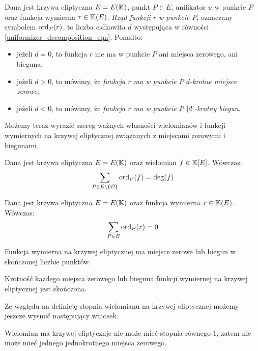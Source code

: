 \begin{definition}
Dana jest krzywa eliptyczna $E = E(\mathbb{K})$,
punkt $P \in E$,
unifikator $u$ w punkcie $P$
oraz funkcja wymierna $r \in \mathbb{K}(E)$.
\emph{Rząd funkcji $r$ w punkcie $P$},
oznaczany symbolem $\operatorname{ord}_P(r)$,
to liczba całkowita $d$
występująca w równości \ref{uniformizer_decomposition_eqn}.
Ponadto:
\begin{itemize}
\item jeżeli $d = 0$,
to funkcja $r$ nie ma w punkcie $P$ ani miejsca zerowego, ani bieguna;
\item jeżeli $d > 0$, to mówimy,
że \emph{funkcja $r$ ma w punkcie $P$ $d$-krotne miejsce zerowe};
\item jeżeli $d < 0$, to mówimy,
że \emph{funkcja $r$ ma w punkcie $P$ $\lvert d\rvert$-krotny biegun}.
\end{itemize}
\end{definition}

Możemy teraz wyrazić szereg ważnych własności
wielomianów i funkcji wymiernych na krzywej eliptycznej
związanych z miejscami zerowymi i biegunami.

\begin{theorem}\label{polynomial_ord_deg_theorem}
Dana jest krzywa eliptyczna $E = E(\mathbb{K})$
oraz wielomian $f \in \mathbb{K}[E]$.
Wówczas:
\begin{equation*}
\sum_{P \in E\setminus \{\mathcal{O}\}} \operatorname{ord}_P(f) = \deg(f)
\end{equation*}
\end{theorem}

\begin{corollary}\label{function_order_sum_zero_corollary}
Dana jest krzywa eliptyczna $E = E(\mathbb{K})$
oraz funkcja wymierna $r \in \mathbb{K}(E)$.
Wówczas:
\begin{equation*}
\sum_{P \in E} \operatorname{ord}_P(r) = 0
\end{equation*}
\end{corollary}

\begin{corollary}
Funkcja wymierna na krzywej eliptycznej ma miejsce zerowe lub biegun
w skończonej liczbie punktów.
\end{corollary}

\begin{corollary}
Krotność każdego miejsca zerowego lub bieguna
funkcji wymiernej na krzywej eliptycznej
jest skończona.
\end{corollary}

Ze względu na definicję stopnia wielomianu na krzywej eliptycznej
możemy jeszcze wysnuć następujący wniosek.

\begin{corollary}\label{poly_no_single_zero_corollary}
Wielomian ma krzywej eliptycznje nie może mieć stopnia równego $1$,
zatem nie może mieć jednego jednokrotnego miejsca zerowego.
\end{corollary}
